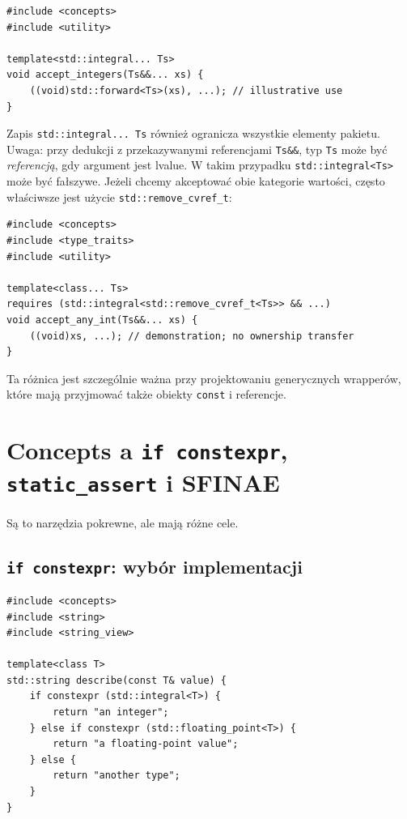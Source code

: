 \begin{lstlisting}
#include <concepts>
#include <utility>

template<std::integral... Ts>
void accept_integers(Ts&&... xs) {
    ((void)std::forward<Ts>(xs), ...); // illustrative use
}
\end{lstlisting}

Zapis \texttt{std::integral... Ts} również ogranicza wszystkie
elementy pakietu. Uwaga: przy dedukcji z przekazywanymi referencjami
\texttt{Ts\&\&}, typ \texttt{Ts} może być \emph{referencją},
gdy argument jest lvalue. W takim przypadku
\texttt{std::integral<Ts>} może być fałszywe.
Jeżeli chcemy akceptować obie kategorie wartości, często
właściwsze jest użycie \texttt{std::remove\_cvref\_t}:

\begin{lstlisting}
#include <concepts>
#include <type_traits>
#include <utility>

template<class... Ts>
requires (std::integral<std::remove_cvref_t<Ts>> && ...)
void accept_any_int(Ts&&... xs) {
    ((void)xs, ...); // demonstration; no ownership transfer
}
\end{lstlisting}

Ta różnica jest szczególnie ważna przy projektowaniu generycznych
wrapperów, które mają przyjmować także obiekty \texttt{const}
i referencje.

\section{Concepts a \texttt{if constexpr}, \texttt{static\_assert} i SFINAE}
\label{sec:concepts-porownanie}

Są to narzędzia pokrewne, ale mają różne cele.

\subsection{\texttt{if constexpr}: wybór implementacji}

\begin{lstlisting}
#include <concepts>
#include <string>
#include <string_view>

template<class T>
std::string describe(const T& value) {
    if constexpr (std::integral<T>) {
        return "an integer";
    } else if constexpr (std::floating_point<T>) {
        return "a floating-point value";
    } else {
        return "another type";
    }
}
\end{lstlisting}

